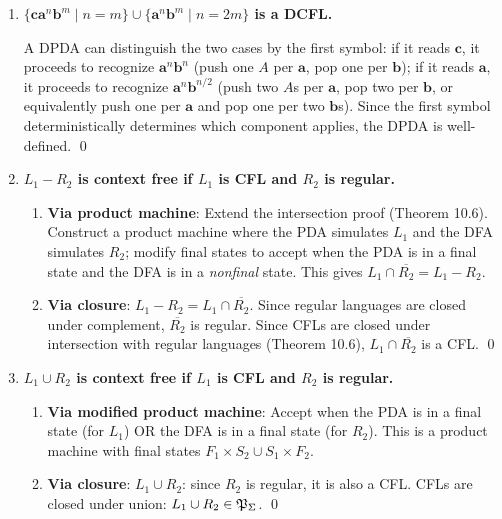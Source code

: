\begin{enumerate}[{10.}1. ]
\item \textbf{$\{\pmb{ca}^n\pmb{b}^m \mid n=m\}\cup\{\pmb{a}^n\pmb{b}^m \mid n=2m\}$ is a DCFL.}

A DPDA can distinguish the two cases by the first symbol: if it reads $\pmb{c}$, it proceeds to recognize $\pmb{a}^n\pmb{b}^n$ (push one $A$ per $\pmb{a}$, pop one per $\pmb{b}$); if it reads $\pmb{a}$, it proceeds to recognize $\pmb{a}^n\pmb{b}^{n/2}$ (push two $A$s per $\pmb{a}$, pop two per $\pmb{b}$, or equivalently push one per $\pmb{a}$ and pop one per two $\pmb{b}$s). Since the first symbol deterministically determines which component applies, the DPDA is well-defined. \qed

\item \textbf{$L_1 - R_2$ is context free if $L_1$ is CFL and $R_2$ is regular.}

\begin{enumerate}
\item \textbf{Via product machine}: Extend the intersection proof (Theorem 10.6). Construct a product machine where the PDA simulates $L_1$ and the DFA simulates $R_2$; modify final states to accept when the PDA is in a final state and the DFA is in a \emph{nonfinal} state. This gives $L_1 \cap \overline{R_2} = L_1 - R_2$.

\item \textbf{Via closure}: $L_1 - R_2 = L_1 \cap \overline{R_2}$. Since regular languages are closed under complement, $\overline{R_2}$ is regular. Since CFLs are closed under intersection with regular languages (Theorem 10.6), $L_1 \cap \overline{R_2}$ is a CFL. \qed
\end{enumerate}

\item \textbf{$L_1\cup R_2$ is context free if $L_1$ is CFL and $R_2$ is regular.}

\begin{enumerate}
\item \textbf{Via modified product machine}: Accept when the PDA is in a final state (for $L_1$) OR the DFA is in a final state (for $R_2$). This is a product machine with final states $F_1 \times S_2 \cup S_1 \times F_2$.

\item \textbf{Via closure}: $L_1 \cup R_2$: since $R_2$ is regular, it is also a CFL. CFLs are closed under union: $L_1 \cup R_2 \in \mathfrak{P}_\Sigma$. \qed
\end{enumerate}


\end{enumerate}
